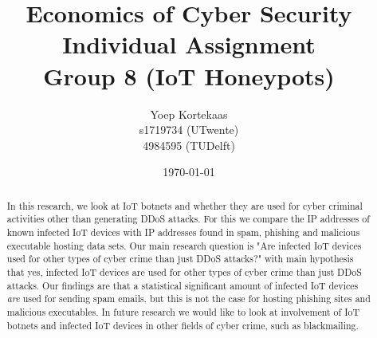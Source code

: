 \documentclass[a4paper,10pt]{article}
\title{Economics of Cyber Security \\
  Individual Assignment  \\
  \large Group 8 (IoT Honeypots)}
\author{
  Yoep Kortekaas \\ 
  s1719734 (UTwente) \\
  4984595 (TUDelft)
}
\date{\today}
\begin{document}
\maketitle

\begin{abstract}
In this research, we look at IoT botnets and whether they are used for cyber criminal activities other than generating DDoS attacks. 
For this we compare the IP addresses of  known infected IoT devices with IP addresses found in spam, phishing and malicious executable hosting data 
sets. Our main research question is "Are infected IoT devices used for other types of cyber crime than just DDoS attacks?" with main 
hypothesis that yes, infected IoT devices are used for other types of cyber crime than just DDoS attacks. Our findings are that a 
statistical significant amount of infected IoT devices \textit{are} used for sending spam emails, but this is not the case for hosting 
phishing sites and malicious executables. In future research we would like to look at involvement of IoT botnets and infected IoT 
devices in other fields of cyber crime, such as blackmailing.
\end{abstract}
\end{document}
